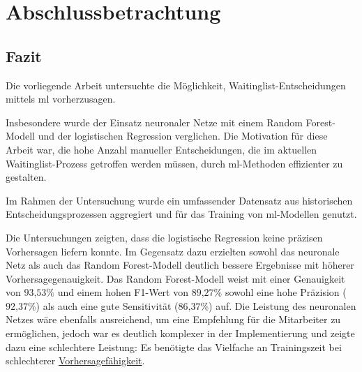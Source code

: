

\chapter{Abschlussbetrachtung}
\section{Fazit}
Die vorliegende Arbeit untersuchte die Möglichkeit, Waitinglist-Entscheidungen mittels \gls{ml} vorherzusagen. 


Insbesondere wurde der Einsatz neuronaler Netze mit einem Random Forest-Modell und der logistischen Regression verglichen. Die Motivation für diese Arbeit war, die hohe Anzahl manueller Entscheidungen, die im aktuellen Waitinglist-Prozess getroffen werden müssen, durch \gls{ml}-Methoden effizienter zu gestalten.

Im Rahmen der Untersuchung wurde ein umfassender Datensatz aus historischen Entscheidungsprozessen aggregiert und für das Training von \gls{ml}-Modellen genutzt. 

Die Untersuchungen zeigten, dass die logistische Regression keine präzisen Vorhersagen liefern konnte.
Im Gegensatz dazu erzielten sowohl das neuronale Netz als auch das Random Forest-Modell deutlich bessere Ergebnisse mit höherer Vorhersagegenauigkeit.
Das Random Forest-Modell weist mit einer Genauigkeit von $93\text{,}53\%$ und einem hohen F1-Wert von $89\text{,}27\%$ sowohl eine hohe Präzision ($92\text{,}37\%$) als auch eine gute Sensitivität ($86\text{,}37\%$) auf.  
Die Leistung des neuronalen Netzes wäre ebenfalls ausreichend, um eine Empfehlung für die Mitarbeiter zu ermöglichen, jedoch war es deutlich komplexer in der Implementierung und zeigte dazu eine schlechtere Leistung: Es benötigte das Vielfache an Trainingszeit bei schlechterer \hyperref[sec:model_results]{Vorhersagefähigkeit}. 

